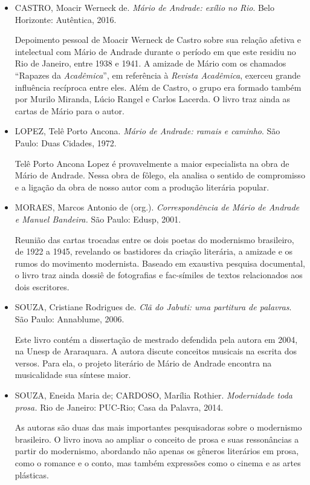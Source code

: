 \documentclass[11pt]{extarticle}
\begin{document}
\begin{itemize}
\item CASTRO, Moacir Werneck de. \emph{Mário de Andrade: exílio no Rio}.
Belo Horizonte: Autêntica, 2016.

Depoimento pessoal de Moacir Werneck de Castro sobre sua relação afetiva
e intelectual com Mário de Andrade durante o período em que este residiu
no Rio de Janeiro, entre 1938 e 1941. A amizade de Mário com os chamados
``Rapazes da \emph{Acadêmica}'', em referência à \emph{Revista
Acadêmica}, exerceu grande influência recíproca entre eles. Além de
Castro, o grupo era formado também por Murilo Miranda, Lúcio Rangel e
Carlos Lacerda. O livro traz ainda as cartas de Mário para o autor.

\item LOPEZ, Telê Porto Ancona. \emph{Mário de Andrade: ramais e caminho}.
São Paulo: Duas Cidades, 1972.

Telê Porto Ancona Lopez é provavelmente a maior especialista na obra de
Mário de Andrade. Nessa obra de fôlego, ela analisa o sentido de
compromisso e a ligação da obra de nosso autor com a produção literária
popular.

\item MORAES, Marcos Antonio de (org.). \emph{Correspondência de Mário de
Andrade e Manuel Bandeira.} São Paulo: Edusp, 2001.

Reunião das cartas trocadas entre os dois poetas do modernismo
brasileiro, de 1922 a 1945, revelando os bastidores da criação
literária, a amizade e os rumos do movimento modernista. Baseado em
exaustiva pesquisa documental, o livro traz ainda dossiê de fotografias
e fac-símiles de textos relacionados aos dois escritores.

\item SOUZA, Cristiane Rodrigues de. \emph{Clã do Jabuti: uma
partitura de palavras}. São Paulo: Annablume, 2006.

Este livro contém a dissertação de mestrado defendida pela autora em
2004, na Unesp de Araraquara. A autora discute conceitos musicais na
escrita dos versos. Para ela, o projeto literário de Mário de Andrade
encontra na musicalidade sua síntese maior.

\item SOUZA, Eneida Maria de; CARDOSO, Marília Rothier. \emph{Modernidade
toda prosa.} Rio de Janeiro: PUC-Rio; Casa da Palavra, 2014.

As autoras são duas das mais importantes pesquisadoras sobre o
modernismo brasileiro. O livro inova ao ampliar o conceito de prosa e
suas ressonâncias a partir do modernismo, abordando não apenas os
gêneros literários em prosa, como o romance e o conto, mas também
expressões como o cinema e as artes plásticas.


\end{itemize}
\end{document}
